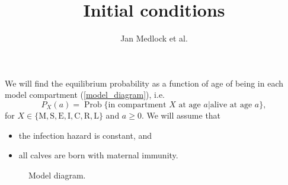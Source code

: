 \documentclass[12pt]{article}
\title{Initial conditions}
\author{Jan Medlock et al.}
\DeclareMathOperator{\Prob}{Prob}
\begin{document}
\maketitle

We will find the equilibrium probability as a function of age of being
in each model compartment (\autoref{model_diagram}), i.e.
\begin{equation}
  P_X(a) = \Prob\{\text{in compartment $X$ at age $a$}|\text{alive at
    age $a$}\},
\end{equation}
for $X \in \{\mathrm{M}, \mathrm{S}, \mathrm{E}, \mathrm{I},
\mathrm{C}, \mathrm{R}, \mathrm{L}\}$ and $a \geq 0$.
We will assume that
\begin{itemize}
\item the infection hazard is constant, and
\item all calves are born with maternal immunity.
\end{itemize}

\begin{figure}
  \begin{center}
    
  \end{center}
  \caption{Model diagram.}
  \label{model_diagram}
\end{figure}

\clearpage
\end{document}
